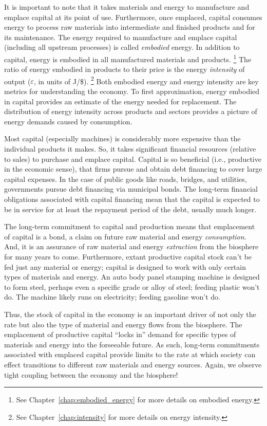 It is important to note that it takes materials and energy
to manufacture and emplace capital at its point of use.
Furthermore, once emplaced,
capital consumes energy to process raw materials 
into intermediate and finished products
and for its maintenance.
The energy required to manufacture and emplace capital
(including all upstream processes)
is called \emph{embodied} energy.
In addition to capital, energy is embodied in all manufactured materials and
products.%
	\footnote{
	See Chapter~\ref{chap:embodied_energy} for more details
	on embodied energy.
	}
The ratio of energy embodied in products to their price 
is the energy \emph{intensity} of output ($\varepsilon$, 
in units of J/\$).%
	\footnote{
	See Chapter~\ref{chap:intensity} for more details 
	on energy intensity.
	}
Both embodied energy and energy intensity are key metrics 
for understanding the economy.
To first approximation, energy embodied in capital provides an estimate of the 
energy needed for replacement.
The distribution of energy intensity
across products and sectors
provides a picture of energy demands caused by consumption.

Most capital (especially machines) is considerably more expensive
than the individual products it makes.
So, it takes significant financial resources (relative to sales) 
to purchase and emplace capital.
Capital is so beneficial (i.e., productive in the economic sense), 
that firms pursue and obtain debt financing to cover large capital expenses.
In the case of public goods like roads, bridges, and utilities,
governments pursue debt financing via municipal bonds.
The long-term financial obligations associated with capital financing 
mean that the capital is expected to be in service
for at least the repayment period of the debt,
usually much longer.

The long-term commitment to capital and production means that 
emplacement of capital is a bond, a claim on future
raw material and energy \emph{consumption}.
And, it is an assurance of raw material and energy \emph{extraction} 
from the biosphere for many years to come.
Furthermore, extant productive capital stock can't be fed just any material or energy;
capital is designed to work with only certain types of materials and energy.
An auto body panel stamping machine is designed to form steel, perhaps even a specific 
grade or alloy of steel;
feeding plastic won't do.
The machine likely runs on electricity; 
feeding gasoline won't do.

Thus, the stock of capital in the economy 
is an important driver of not only 
the rate but also  
the type of
material and energy flows from the biosphere.
The emplacement of productive capital
``locks in'' demand for specific types of materials and energy 
into the forseeable future.
As such, long-term commitments associated with emplaced capital
provide limits to the rate at which society can effect
transitions to different raw materials and energy sources.
Again, we observe tight coupling between the economy and the biosphere!

